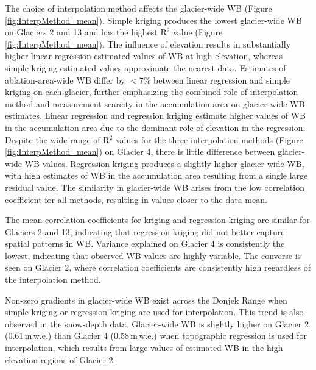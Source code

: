 \documentclass{sfuthesis}
\begin{document}
The choice of interpolation method affects the glacier-wide WB (Figure \ref{fig:InterpMethod_mean}). Simple kriging produces the lowest glacier-wide WB on Glaciers 2 and 13 and has the highest R$^2$ value (Figure \ref{fig:InterpMethod_mean}). The influence of elevation results in substantially higher linear-regression-estimated values of WB at high elevation, whereas simple-kriging-estimated values approximate the nearest data. Estimates of ablation-area-wide WB differ by $<$7\% between linear regression and simple kriging on each glacier, further emphasizing the combined role of interpolation method and measurement scarcity in the accumulation area on glacier-wide WB estimates. Linear regression and regression kriging estimate higher values of WB in the accumulation area due to the dominant role of elevation in the regression. Despite the wide range of R$^2$ values for the three interpolation methods (Figure \ref{fig:InterpMethod_mean}) on Glacier 4, there is little difference between glacier-wide WB values. Regression kriging produces a slightly higher glacier-wide WB, with high estimates of WB in the accumulation area resulting from a single large residual value. The similarity in glacier-wide WB arises from the low correlation coefficient for all methods, resulting in values closer to the data mean. 

The mean correlation coefficients for kriging and regression kriging are similar for Glaciers 2 and 13, indicating that regression kriging did not better capture spatial patterns in WB. Variance explained on Glacier 4 is consistently the lowest, indicating that observed WB values are highly variable. The converse is seen on Glacier 2, where correlation coefficients are consistently high regardless of the interpolation method.

Non-zero gradients in glacier-wide WB exist across the Donjek Range when simple kriging or regression kriging are used for interpolation. This trend is also observed in the snow-depth data. Glacier-wide WB is slightly higher on Glacier 2 (0.61\,m\,w.e.) than Glacier 4 (0.58\,m\,w.e.) when topographic regression is used for interpolation, which results from large values of estimated WB in the high elevation regions of Glacier 2.
\end{document}
